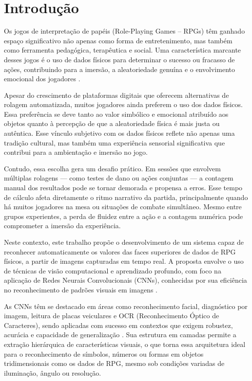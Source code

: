\section{Introdução}

Os jogos de interpretação de papéis (Role-Playing Games – RPGs) têm ganhado espaço
significativo não apenas como forma de entretenimento, mas também como ferramenta 
pedagógica, terapêutica e social. Uma característica marcante desses jogos é o uso 
de dados físicos para determinar o sucesso ou fracasso de ações, contribuindo para 
a imersão, a aleatoriedade genuína e o envolvimento emocional dos jogadores 
\cite{datacamp_cnn, hitchens2007roleplaying}.

Apesar do crescimento de plataformas digitais que oferecem alternativas de rolagem 
automatizada, muitos jogadores ainda preferem o uso dos dados físicos. Essa preferência 
se deve tanto ao valor simbólico e emocional atribuído aos objetos quanto à percepção 
de que a aleatoriedade física é mais justa ou autêntica. Esse vínculo subjetivo com 
os dados físicos reflete não apenas uma tradição cultural, mas também uma experiência 
sensorial significativa que contribui para a ambientação e imersão no jogo.

Contudo, essa escolha gera um desafio prático. Em sessões que envolvem múltiplas 
rolagens — como testes de dano ou ações conjuntas — a contagem manual dos resultados 
pode se tornar demorada e propensa a erros. Esse tempo de cálculo afeta diretamente 
o ritmo narrativo da partida, principalmente quando há muitos jogadores na mesa ou 
situações de combate simultâneo. Mesmo entre grupos experientes, a perda de fluidez 
entre a ação e a contagem numérica pode comprometer a imersão da experiência.

Neste contexto, este trabalho propõe o desenvolvimento de um sistema capaz de 
reconhecer automaticamente os valores das faces superiores de dados de RPG físicos, 
a partir de imagens capturadas em tempo real. A proposta envolve o uso de técnicas 
de visão computacional e aprendizado profundo, com foco na aplicação de Redes Neurais 
Convolucionais (CNNs), conhecidas por sua eficiência no reconhecimento de padrões 
visuais em imagens \cite{lecun1998gradient, ibm_cnn, datacamp_cnn}.

As CNNs têm se destacado em áreas como reconhecimento facial, diagnóstico por imagem, 
leitura de placas veiculares e OCR (Reconhecimento Óptico de Caracteres), sendo 
aplicadas com sucesso em contextos que exigem robustez, acurácia e capacidade de 
generalização \cite{lecun1998gradient, goodfellow2016deep}. Sua estrutura em camadas 
permite a extração hierárquica de características visuais, o que torna essa 
arquitetura ideal para o reconhecimento de símbolos, números ou formas em objetos 
tridimensionais como os dados de RPG, mesmo sob condições variadas de iluminação, 
ângulo ou resolução.

